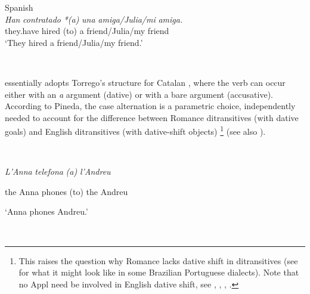 \documentclass[output=paper]{langscibook}
\begin{document}
\ea\label{ex:key:2}
{Spanish \citep{Torrego2010}}\\
\gll \textit{Han}     \textit{contratado}  \textit{*(a)} \textit{una} \textit{amiga/Julia/mi} \textit{amiga.}\\
they.have   hired      (to) a friend/Julia/my friend\\
\glt ‘They hired a friend/Julia/my friend.’
\z 

\ea\label{ex:key:}
{}\\
\z

\citet[359-360]{Pineda2016} essentially adopts Torrego’s structure for Catalan , where the verb can occur either with an \textit{a} argument (dative) or with a bare argument (accusative). According to Pineda, the case alternation is a parametric choice, independently needed to account for the difference between Romance ditransitives (with dative goals) and English ditransitives (with dative-shift objects){} \footnote{This raises the question why Romance lacks dative shift in ditransitives (see \citet{Salles2016} for what it might look like in some Brazilian Portuguese dialects). Note that no Appl need be involved in English dative shift, see \citet{Kayne1984}, \citet{Pesetsky1995}, \citet{Harley2002}, \citet{BeckJohnson2005}.} (see also \citealt{Pineda2014}).

\ea\label{ex:key:}
{}\\
\z

\textit{L’Anna}   \textit{telefona}   \textit{(a)} \textit{l’Andreu}

  the Anna   phones   (to) the Andreu

  ‘Anna phones Andreu.’

\ea\label{ex:key:}
{}\\
\z
\end{document}
